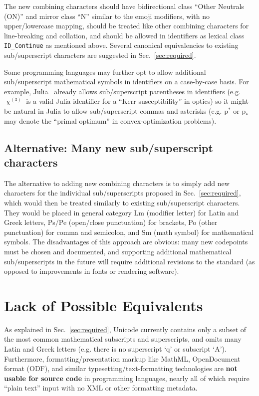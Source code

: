 \documentclass[10pt,english]{article}
\newcommand{\secref}[1]{Sec.~\ref{sec:#1}}
\begin{document}
The new combining characters should have bidirectional class ``Other Neutrals (ON)'' and mirror class ``N'' similar to the emoji modifiers, with no upper/lowercase mapping, should be treated like other combining characters for line-breaking and collation, and should be allowed in identifiers as lexical class \texttt{ID\_Continue} as mentioned above.   Several  canonical equivalencies to existing sub/superscript characters are suggested in \secref{required}.

Some programming languages may further opt to allow additional sub/superscript mathematical symbols in identifiers on a case-by-case basis. For example, Julia~\cite{Julia} already allows sub/superscript parentheses in identifiers (e.g. $\upchi^{(3)}$ is a valid Julia identifier for a ``Kerr susceptibility'' in optics) so it might be natural in Julia to allow sub/superscript commas and asterisks (e.g. $\mathrm{p}^*$ or $\mathrm{p}_*$ may denote the ``primal optimum'' in convex-optimization problems).

\subsection{Alternative: Many new sub/superscript characters}

The alternative to adding new combining characters is to simply add new characters for the individual sub/superscripts proposed in \secref{required}, which would then be treated similarly to existing sub/superscript characters.  They would be placed in general category Lm (modifier letter) for Latin and Greek letters, Ps/Pe (open/close punctuation) for brackets, Po (other punctuation) for comma and semicolon, and Sm (math symbol) for mathematical symbols.   The disadvantages of this approach are obvious: many new codepoints must be chosen and documented, and supporting additional mathematical sub/superscripts in the future will require additional revisions to the standard (as opposed to improvements in fonts or rendering software).

\section{Lack of Possible Equivalents}

As explained in \secref{required}, Unicode currently contains only a subset of the most common mathematical subscripts and superscripts, and omits many Latin and Greek letters (e.g. there is no superscript `q' or subscript `A').  Furthermore, formatting/presentation markup like MathML, OpenDocument format (ODF), and similar typesetting/text-formatting technologies are \textbf{not usable for source code} in programming languages, nearly all of which require ``plain text'' input with no XML or other formatting metadata.
\end{document}
